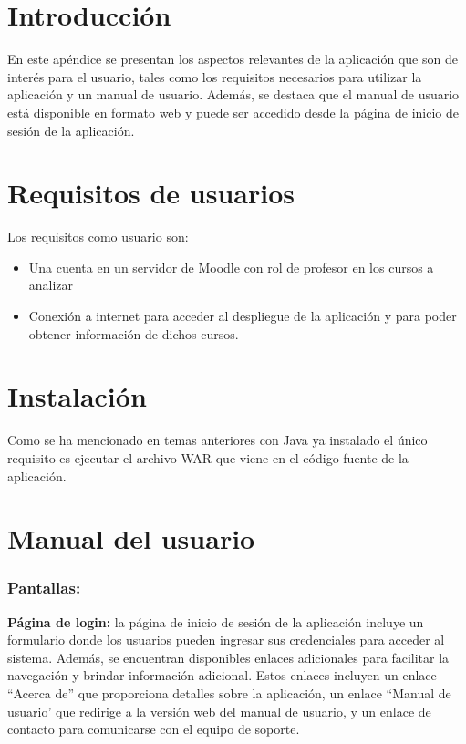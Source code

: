 
\section{Introducción}
En este apéndice se presentan los aspectos relevantes de la aplicación que son de interés para el usuario, tales como los requisitos necesarios para utilizar la aplicación y un manual de usuario. Además, se destaca que el manual de usuario está disponible en formato web y puede ser accedido desde la página de inicio de sesión de la aplicación.
\section{Requisitos de usuarios}
Los requisitos como usuario son:
\begin{itemize}
	\item Una cuenta en un servidor de Moodle con rol de profesor en los cursos a analizar
	\item Conexión a internet para acceder al despliegue de la aplicación y para poder obtener información de dichos cursos.
\end{itemize}
\section{Instalación}
Como se ha mencionado en temas anteriores con Java ya instalado el único requisito es ejecutar el archivo WAR que viene en el código fuente de la aplicación.
\section{Manual del usuario}

\subsubsection{Pantallas:}

\textbf{Página de login:} la página de inicio de sesión de la aplicación incluye un formulario donde los usuarios pueden ingresar sus credenciales para acceder al sistema. Además, se encuentran disponibles enlaces adicionales para facilitar la navegación y brindar información adicional. Estos enlaces incluyen un enlace ``Acerca de'' que proporciona detalles sobre la aplicación, un enlace ``Manual de usuario' que redirige a la versión web del manual de usuario, y un enlace de contacto para comunicarse con el equipo de soporte.

